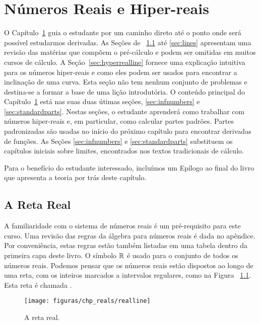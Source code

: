 \documentclass{svmono}
\begin{document}
\mainmatter

\chapter{Números Reais e Hiper-reais}
\label{chp:reals}

O Capítulo~\ref{chp:reals} guia o estudante por um caminho direto até
o ponto onde será possível estudarmos derivadas. As Seções de%
~\ref{sec:realline} até \ref{sec:lines} apresentam uma revisão das
matérias que compõem o pré-cálculo e podem ser omitidas em muitos
cursos de cálculo. A Seção~\ref{sec:hyperrealline} fornece uma
explicação intuitiva para os números hiper-reais e como eles podem
ser usados para encontrar a inclinação de uma curva. Esta seção
não tem nenhum conjunto de problemas e destina-se a formar a base
de uma lição introdutória. O conteúdo principal do Capítulo~\ref{chp:reals}
está nas suas duas útimas seções, \ref{sec:infnumbers} e
\ref{sec:standardparts}. Nestas seções, o estudante aprenderá como
trabalhar com números hiper-reais e, em particular, como calcular
partes padrões. Partes padronizadas são usadas no início do próximo
capítulo para encontrar derivadas de funções. As Seções \ref{sec:infnumbers} e 
\ref{sec:standardparts} substituem os capítulos iniciais sobre limites,
encontrados nos textos tradicionais de cálculo.

Para o benefício do estudante interessado, incluímos um Epílogo ao final
do livro que apresenta a teoria por trás deste capítulo.

\section{A Reta Real}
\label{sec:realline}

A familiaridade com o sistema de números reais é um pré-requisito
para este curso. Uma revisão das regras da álgebra para números reais
é dada no apêndice. Por conveniência, estas regras estão também listadas
em uma tabela dentro da primeira capa deste livro. O símbolo
$\mathbb{R}$ é usado para o conjunto de todos os números reais.
Podemos pensar que os números reais estão dispostos ao longo de uma
reta, com os inteiros marcados a intervalos regulares, como na Figura%
~\ref{fig:realline}. Esta reta é chamada .

\begin{figure}
\begin{center}
\texttt{[image: figuras/chp\_reals/realline]}
\end{center}
\caption{A reta real.}
\label{fig:realline}
\end{figure}
\end{document}
